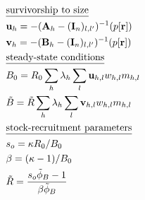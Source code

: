 \documentclass[]{article}
\begin{document}
\begin{align}
    & \mbox{\underline{survivorship to size}} \nonumber \\
    & \textbf{u}_h   = -(\textbf{A}_h - (\textbf{I}_n)_{l,l'})^{-1} (p[\textbf{r}]) \label{T1.13a}\\
    & \textbf{v}_h   = -(\textbf{B}_h - (\textbf{I}_n)_{l,l'})^{-1} (p[\textbf{r}]) \label{T1.13b}\\
    & \mbox{\underline{steady-state conditions}}\nonumber \\
    & B_0 = R_0 \sum_h \lambda_h \sum_l \textbf{u}_{h,l} w_{h,l} m_{h,l} \label{T1.14} \\
    & \tilde{B} = \tilde{R}\sum_h \lambda_h \sum_l \textbf{v}_{h,l} w_{h,l} m_{h,l} \label{T1.16} \\
    & \mbox{\underline{stock-recruitment parameters}}\nonumber \\
    & s_o = \kappa R_0 / B_0 \label{T1.17} \\
    & \beta = (\kappa -1)/B_0 \label{T1.18} \\
    & \tilde{R} = \frac{s_o \tilde{\phi}_B -1}{\beta \tilde{\phi}_B} \label{T1.19} \\
\end{align}
\end{document}
